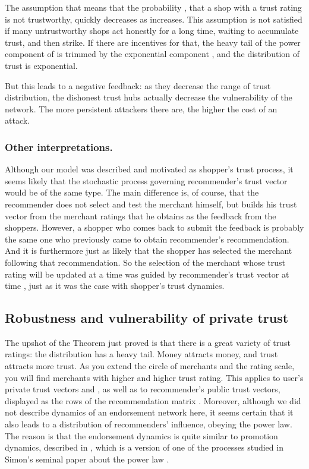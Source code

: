 \documentclass{llncs}
\newcommand{\indiv}{private}
\begin{document}
The assumption that  means that the probability , that a shop with a trust rating  is not trustworthy, quickly decreases as  increases. This assumption is not satisfied if many untrustworthy shops act honestly for a long time, waiting to accumulate trust, and then strike. If there are incentives for that, the heavy tail of the power component of  is trimmed by the exponential component , and the distribution of trust is exponential. 

But this leads to a negative feedback: as they decrease the range of trust distribution, the dishonest trust hubs actually  decrease the vulnerability of the network. The more persistent attackers there are, the higher the cost of an attack.

\subsubsection{Other interpretations.} Although our model was described and motivated as shopper's trust process, it seems likely that the stochastic process governing recommender's trust vector would be of the same type. The main difference is, of course, that the recommender does not select and test the merchant himself, but builds his trust vector from the merchant ratings that he obtains as the feedback from the shoppers. However, a shopper who comes back to submit the feedback is probably the same one who previously came to obtain recommender's recommendation. And it is furthermore just as likely that the shopper has selected the merchant following that recommendation. So the selection of the merchant whose trust rating will be updated at a time  was guided by recommender's trust vector at time , just as it was the case with shopper's trust dynamics.

\subsection{Robustness and vulnerability of {\indiv} trust}\label{Robustness}
The upshot of the Theorem just proved is that there is a great variety of trust ratings: the distribution has a heavy tail. Money attracts money, and trust attracts more trust. As you extend the circle of merchants and the rating scale, you will find merchants with higher and higher trust rating. This applies to user's private trust vectors  and , as well as to recommender's public trust vectors, displayed as the rows of the recommendation matrix . Moreover, although we did not describe dynamics of an endorsement network here, it seems certain that it also leads to a distribution of recommenders' influence, obeying the power law. The reason is that the endorsement dynamics is quite similar to promotion dynamics, described in \cite{PavlovicD:CSR08}, which is a version of one of the processes studied in Simon's seminal paper about the power law \cite{SimonH:skew}.
\end{document}
